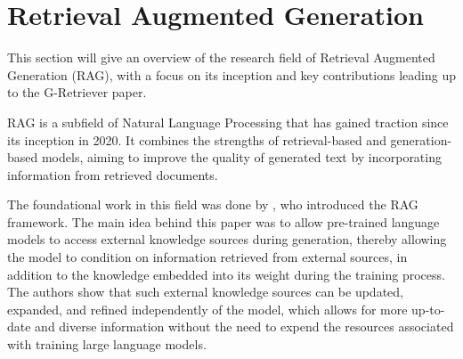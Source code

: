 \section{Retrieval Augmented Generation}

This section will give an overview of the research field of Retrieval Augmented Generation (RAG), with a focus on its inception and key contributions leading up to the G-Retriever paper.

RAG is a subfield of Natural Language Processing that has gained traction since its inception in 2020. It combines the strengths of retrieval-based and generation-based models, aiming to improve the quality of generated text by incorporating information from retrieved documents.

The foundational work in this field was done by \cite{rag}, who introduced the RAG framework.
The main idea behind this paper was to allow pre-trained language models to access external knowledge sources during generation, thereby allowing the model to condition on information retrieved from external sources, in addition to  the knowledge embedded into its weight during the training process.
The authors show that such external knowledge sources can be updated, expanded, and refined independently of the model, which allows for more up-to-date and diverse information without the need to expend the resources associated with training large language models.